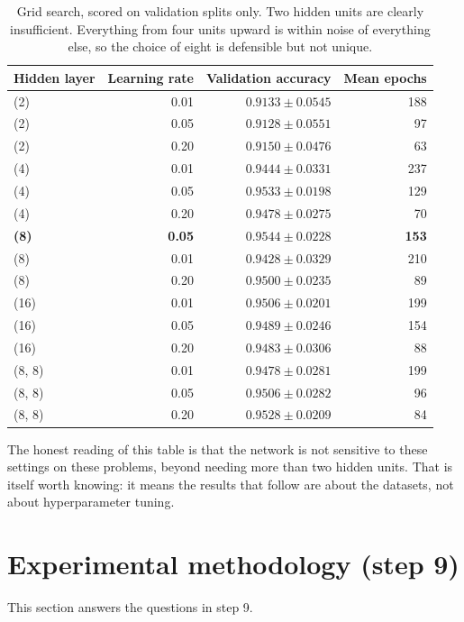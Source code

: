 \documentclass[11pt]{article}
\begin{document}
\begin{table}[H]
\centering
\small
\begin{tabular}{lrrr}
\toprule
Hidden layer & Learning rate & Validation accuracy & Mean epochs \\
\midrule
(2)    & 0.01 & $0.9133 \pm 0.0545$ & 188 \\
(2)    & 0.05 & $0.9128 \pm 0.0551$ &  97 \\
(2)    & 0.20 & $0.9150 \pm 0.0476$ &  63 \\
(4)    & 0.01 & $0.9444 \pm 0.0331$ & 237 \\
(4)    & 0.05 & $0.9533 \pm 0.0198$ & 129 \\
(4)    & 0.20 & $0.9478 \pm 0.0275$ &  70 \\
\textbf{(8)} & \textbf{0.05} & $\mathbf{0.9544 \pm 0.0228}$ & \textbf{153} \\
(8)    & 0.01 & $0.9428 \pm 0.0329$ & 210 \\
(8)    & 0.20 & $0.9500 \pm 0.0235$ &  89 \\
(16)   & 0.01 & $0.9506 \pm 0.0201$ & 199 \\
(16)   & 0.05 & $0.9489 \pm 0.0246$ & 154 \\
(16)   & 0.20 & $0.9483 \pm 0.0306$ &  88 \\
(8, 8) & 0.01 & $0.9478 \pm 0.0281$ & 199 \\
(8, 8) & 0.05 & $0.9506 \pm 0.0282$ &  96 \\
(8, 8) & 0.20 & $0.9528 \pm 0.0209$ &  84 \\
\bottomrule
\end{tabular}
\caption{Grid search, scored on validation splits only. Two hidden units are
clearly insufficient. Everything from four units upward is within noise of
everything else, so the choice of eight is defensible but not unique.}
\end{table}

The honest reading of this table is that the network is not sensitive to these
settings on these problems, beyond needing more than two hidden units. That is
itself worth knowing: it means the results that follow are about the datasets,
not about hyperparameter tuning.

\section{Experimental methodology (step 9)}
\label{sec:method}

This section answers the questions in step 9.
\end{document}
